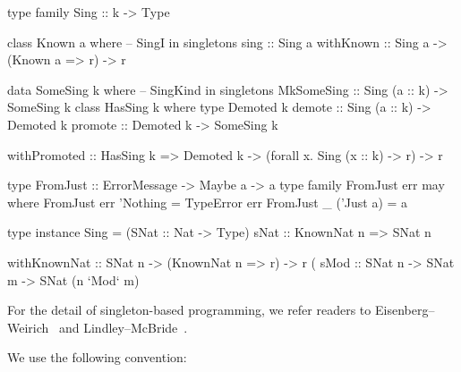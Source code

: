 \documentclass[demotion-paper.tex]{subfiles}
\begin{document}
\begin{code}
type family Sing :: k -> Type

class Known a where -- SingI in singletons
  sing :: Sing a
withKnown :: Sing a -> (Known a => r) -> r

data SomeSing k where -- SingKind in singletons
  MkSomeSing :: Sing (a :: k) -> SomeSing k
class HasSing k where
  type Demoted k 
  demote :: Sing (a :: k) -> Demoted k
  promote :: Demoted k -> SomeSing k

withPromoted :: HasSing k
  => Demoted k
  -> (forall x. Sing (x :: k) -> r) -> r

type FromJust :: ErrorMessage -> Maybe a -> a
type family FromJust err may where 
  FromJust err 'Nothing = TypeError err
  FromJust _ ('Just a)  = a

type instance Sing = (SNat :: Nat -> Type)
sNat :: KnownNat n => SNat n

withKnownNat :: SNat n -> (KnownNat n => r) -> r
(%
sMod :: SNat n -> SNat m -> SNat (n `Mod` m)
\end{code}

For the detail of singleton-based programming, we refer readers to Eisenberg--Weirich~\cite{Eisenberg:2012} and Lindley--McBride~\cite{10.1145/2503778.2503786}.

We use the following convention:
\end{document}
